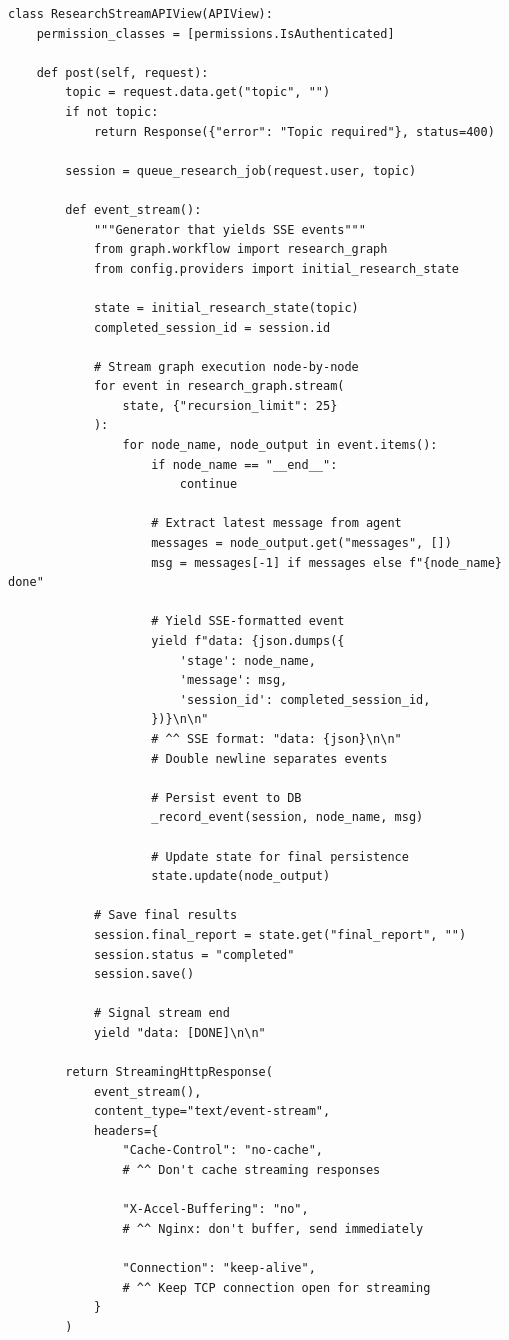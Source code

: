 \documentclass[11pt,a4paper,twoside]{report}
\begin{document}
\begin{lstlisting}[style=pythonstyle,caption={views.py --- Server-Sent Events Streaming}]
class ResearchStreamAPIView(APIView):
    permission_classes = [permissions.IsAuthenticated]

    def post(self, request):
        topic = request.data.get("topic", "")
        if not topic:
            return Response({"error": "Topic required"}, status=400)

        session = queue_research_job(request.user, topic)

        def event_stream():
            """Generator that yields SSE events"""
            from graph.workflow import research_graph
            from config.providers import initial_research_state

            state = initial_research_state(topic)
            completed_session_id = session.id

            # Stream graph execution node-by-node
            for event in research_graph.stream(
                state, {"recursion_limit": 25}
            ):
                for node_name, node_output in event.items():
                    if node_name == "__end__":
                        continue

                    # Extract latest message from agent
                    messages = node_output.get("messages", [])
                    msg = messages[-1] if messages else f"{node_name} done"

                    # Yield SSE-formatted event
                    yield f"data: {json.dumps({
                        'stage': node_name,
                        'message': msg,
                        'session_id': completed_session_id,
                    })}\n\n"
                    # ^^ SSE format: "data: {json}\n\n"
                    # Double newline separates events

                    # Persist event to DB
                    _record_event(session, node_name, msg)

                    # Update state for final persistence
                    state.update(node_output)

            # Save final results
            session.final_report = state.get("final_report", "")
            session.status = "completed"
            session.save()

            # Signal stream end
            yield "data: [DONE]\n\n"

        return StreamingHttpResponse(
            event_stream(),
            content_type="text/event-stream",
            headers={
                "Cache-Control": "no-cache",
                # ^^ Don't cache streaming responses

                "X-Accel-Buffering": "no",
                # ^^ Nginx: don't buffer, send immediately

                "Connection": "keep-alive",
                # ^^ Keep TCP connection open for streaming
            }
        )
\end{lstlisting}
\end{document}
